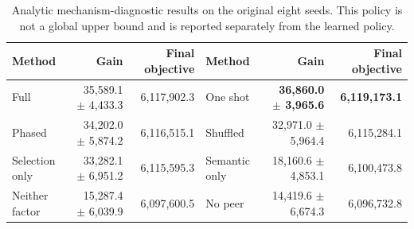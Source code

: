 \begin{table}[t]
  \caption{Analytic mechanism-diagnostic results on the original eight seeds.
  This policy is not a global upper bound and is reported separately from the
  learned policy.}
  \label{tab:v51-oracle}
  \centering
  \scriptsize
  \begin{tabular}{lrr@{\qquad}lrr}
    \toprule
    Method & Gain & Final objective & Method & Gain & Final objective \\
    \midrule
    Full & 35,589.1 $\pm$ 4,433.3 & 6,117,902.3 & One shot & \textbf{36,860.0 $\pm$ 3,965.6} & \textbf{6,119,173.1} \\
    Phased & 34,202.0 $\pm$ 5,874.2 & 6,116,515.1 & Shuffled & 32,971.0 $\pm$ 5,964.4 & 6,115,284.1 \\
    Selection only & 33,282.1 $\pm$ 6,951.2 & 6,115,595.3 & Semantic only & 18,160.6 $\pm$ 4,853.1 & 6,100,473.8 \\
    Neither factor & 15,287.4 $\pm$ 6,039.9 & 6,097,600.5 & No peer & 14,419.6 $\pm$ 6,674.3 & 6,096,732.8 \\
    \bottomrule
  \end{tabular}
\end{table}
